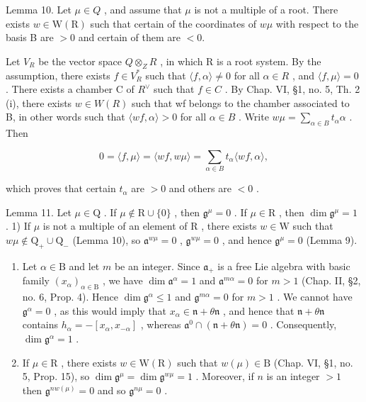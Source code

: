 Lemma 10. Let \(\mu\in Q\) , and assume that \(\mu\) is not a multiple of a root. There exists \(w\in\mathrm{W}(\mathrm{R})\) such that certain of the coordinates of \(w\mu\) with respect to the basis B are \(> 0\) and certain of them are \(< 0\).

Let \(V_{R}\) be the vector space \(Q \otimes_{Z} R\) , in which R is a root system. By the assumption, there exists \(f \in V_{R}^{*}\) such that \(\langle f, \alpha \rangle \neq 0\) for all \(\alpha \in R\) , and \(\langle f, \mu \rangle = 0\) . There exists a chamber C of \(R^{\vee}\) such that \(f \in C\) . By Chap. VI, §1, no. 5, Th. 2 (i), there exists \(w \in W(R)\) such that wf belongs to the chamber associated to B, in other words such that \(\langle wf, \alpha \rangle > 0\) for all \(\alpha \in B\) . Write \(w\mu = \sum_{\alpha \in B} t_{\alpha}\alpha\) . Then

\[
0 = \langle f, \mu \rangle = \langle w f, w \mu \rangle = \sum_ {\alpha \in B} t _ {\alpha} \langle w f, \alpha \rangle ,
\]

which proves that certain \(t_{\alpha}\) are \(> 0\) and others are \(< 0\) .

Lemma 11. Let \(\mu \in \mathrm{Q}\) . If \(\mu \notin \mathrm{R} \cup \{0\}\) , then \(\mathfrak{g}^{\mu} = 0\) . If \(\mu \in \mathrm{R}\) , then \(\dim \mathfrak{g}^{\mu} = 1\) . 1) If \(\mu\) is not a multiple of an element of \(\mathrm{R}\) , there exists \(w \in \mathrm{W}\) such that \(w\mu \notin \mathrm{Q}_{+} \cup \mathrm{Q}_{-}\) (Lemma 10), so \(\mathfrak{a}^{w\mu} = 0\) , \(\mathfrak{g}^{w\mu} = 0\) , and hence \(\mathfrak{g}^{\mu} = 0\) (Lemma 9).

\begin{enumerate}
\def\labelenumi{\arabic{enumi})}
\setcounter{enumi}{1}
\item
  Let \(\alpha \in \mathrm{B}\) and let \(m\) be an integer. Since \(\mathfrak{a}_{+}\) is a free Lie algebra with basic family \((x_{\alpha})_{\alpha \in \mathrm{B}}\) , we have \(\dim \mathfrak{a}^{\alpha} = 1\) and \(\mathfrak{a}^{m\alpha} = 0\) for \(m > 1\) (Chap. II, §2, no. 6, Prop. 4). Hence \(\dim \mathfrak{g}^{\alpha} \leq 1\) and \(\mathfrak{g}^{m\alpha} = 0\) for \(m > 1\) . We cannot have \(\mathfrak{g}^{\alpha} = 0\) , as this would imply that \(x_{\alpha} \in \mathfrak{n} + \theta \mathfrak{n}\) , and hence that \(\mathfrak{n} + \theta \mathfrak{n}\) contains \(h_{\alpha} = -[x_{\alpha}, x_{-\alpha}]\) , whereas \(\mathfrak{a}^0 \cap (\mathfrak{n} + \theta \mathfrak{n}) = 0\) . Consequently, \(\dim \mathfrak{g}^{\alpha} = 1\) .
\item
  If \(\mu \in \mathrm{R}\) , there exists \(w \in \mathrm{W}(\mathrm{R})\) such that \(w(\mu) \in \mathrm{B}\) (Chap. VI, §1, no. 5, Prop. 15), so \(\dim \mathfrak{g}^{\mu} = \dim \mathfrak{g}^{w\mu} = 1\) . Moreover, if \(n\) is an integer \(>1\) then \(\mathfrak{g}^{nw(\mu)} = 0\) and so \(\mathfrak{g}^{n\mu} = 0\) .
\end{enumerate}

